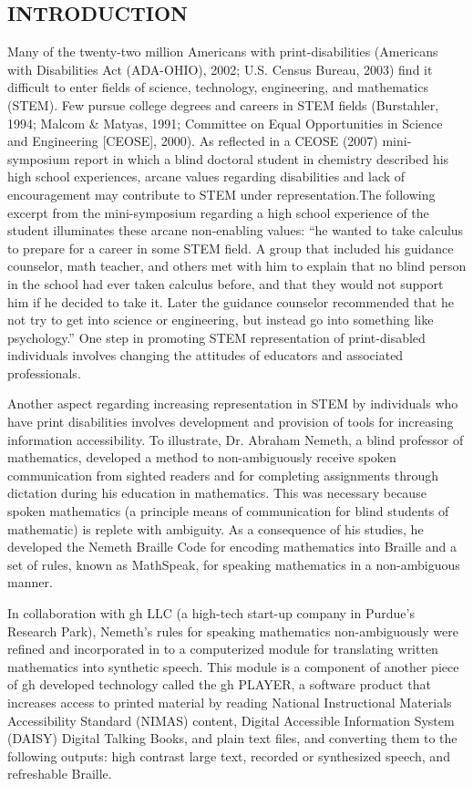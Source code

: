 \documentclass[11.5pt]{sig-alternate} %
\begin{document}
\begin{large}
\section*{INTRODUCTION}
Many of the twenty-two million Americans with print-disabilities (Americans with Disabilities Act (ADA-OHIO), 2002; U.S. Census Bureau, 2003) find it difficult to enter fields of science, technology, engineering, and mathematics (STEM). Few pursue college degrees and careers in STEM fields (Burstahler, 1994; Malcom \& Matyas, 1991; Committee on Equal Opportunities in Science and Engineering [CEOSE], 2000). As reflected in a CEOSE (2007) mini-symposium report in which a blind doctoral student in chemistry described his high school experiences, arcane values regarding disabilities and lack of encouragement may contribute to STEM under representation.The following excerpt from the mini-symposium regarding a high school experience of the student illuminates these arcane non-enabling values: “he wanted to take calculus to prepare for a career in some STEM field. A group that included his guidance counselor, math teacher, and others met with him to explain that no blind person in the school had ever taken calculus before, and that they would not support him if he decided to take it. Later the guidance counselor recommended that he not try to get into science or engineering, but instead go into something like psychology.” One step in promoting STEM representation of print-disabled individuals involves changing the attitudes of educators and associated professionals.

Another aspect regarding increasing representation in STEM by individuals who have print disabilities involves development and provision of tools for increasing information accessibility. To illustrate, Dr. Abraham Nemeth, a blind professor of mathematics, developed a method to non-ambiguously receive spoken communication from sighted readers and for completing assignments through dictation during his education in mathematics. This was necessary because spoken mathematics (a principle means of communication for blind students of mathematic) is replete with ambiguity. As a consequence of his studies, he developed the Nemeth Braille Code for encoding mathematics into Braille and a set of rules, known as MathSpeak, for speaking mathematics in a non-ambiguous manner.

In collaboration with gh LLC (a high-tech start-up company in Purdue’s Research Park), Nemeth’s rules for speaking mathematics non-ambiguously were refined and incorporated in to a computerized module for translating written mathematics into synthetic speech. This module is a component of another piece of gh developed technology called the gh PLAYER, a software product that increases access to printed material by reading National Instructional Materials Accessibility Standard (NIMAS) content, Digital Accessible Information System (DAISY) Digital Talking Books, and plain text files, and converting them to the following outputs: high contrast large text, recorded or synthesized speech, and refreshable Braille.


\end{large}
\end{document}
